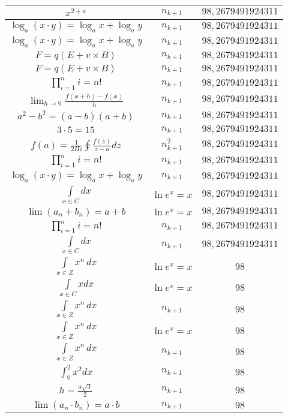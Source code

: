 \documentclass{article}
\begin{document}
\begin{flushleft}
\begin{longtable}{|c|c|c|}
$x^{2+a}$ & $n_{k+1}$ & $98,2679491924311$ \\ \hline 
$\log_{a}(x\cdot y)=\log_{a}x+\log_{a}y$ & $n_{k+1}$ & $98,2679491924311$ \\ \hline 
$\log_{a}(x\cdot y)=\log_{a}x+\log_{a}y$ & $n_{k+1}$ & $98,2679491924311$ \\ \hline 
$F=q\left(E+v\times B\right)$ & $n_{k+1}$ & $98,2679491924311$ \\ \hline 
$F=q\left(E+v\times B\right)$ & $n_{k+1}$ & $98,2679491924311$ \\ \hline 
$\prod_{i=1}^ni=n!$ & $n_{k+1}$ & $98,2679491924311$ \\ \hline 
$\lim_{h\to0}\frac{f(x+h)-f(x)}{h}$ & $n_{k+1}$ & $98,2679491924311$ \\ \hline 
$a^2-b^2=(a-b)(a+b)$ & $n_{k+1}$ & $98,2679491924311$ \\ \hline 
$3\cdot 5=15$ & $n_{k+1}$ & $98,2679491924311$ \\ \hline 
$f\left(a\right)=\frac{1}{2\Pi i}\oint\frac{f\left(z\right)}{z-a}dz$ & $n_{k+1}^2$ & $98,2679491924311$ \\ \hline 
$\prod_{i=1}^ni=n!$ & $n_{k+1}$ & $98,2679491924311$ \\ \hline 
$\log_{a}(x\cdot y)=\log_{a}x+\log_{a}y$ & $n_{k+1}$ & $98,2679491924311$ \\ \hline 
$\int \limits_{x\in C}dx$ & $\ln e^x=x$ & $98,2679491924311$ \\ \hline 
$\lim\left(a_n+b_n\right)=a+b$ & $\ln e^x=x$ & $98,2679491924311$ \\ \hline 
$\prod_{i=1}^ni=n!$ & $n_{k+1}$ & $98,2679491924311$ \\ \hline 
$\int \limits_{x\in C}dx$ & $n_{k+1}$ & $98,2679491924311$ \\ \hline 
$\int \limits_{x\in Z}\!x^{n}\,dx$ & $\ln e^x=x$ & $98$ \\ \hline 
$\int \limits_{x\in C}xdx$ & $\ln e^x=x$ & $98$ \\ \hline 
$\int \limits_{x\in Z}\!x^{n}\,dx$ & $n_{k+1}$ & $98$ \\ \hline 
$\int \limits_{x\in Z}\!x^{n}\,dx$ & $\ln e^x=x$ & $98$ \\ \hline 
$\int \limits_{x\in Z}\!x^{n}\,dx$ & $n_{k+1}$ & $98$ \\ \hline 
$\int _0^2x^2dx$ & $n_{k+1}$ & $98$ \\ \hline 
$h=\frac{a\sqrt{3}}{2}$ & $n_{k+1}$ & $98$ \\ \hline 
$\lim\left(a_n\cdot b_n\right)=a\cdot b$ & $n_{k+1}$ & $98$ \\ \hline 

\end{longtable}
\end{flushleft}
\end{document}
